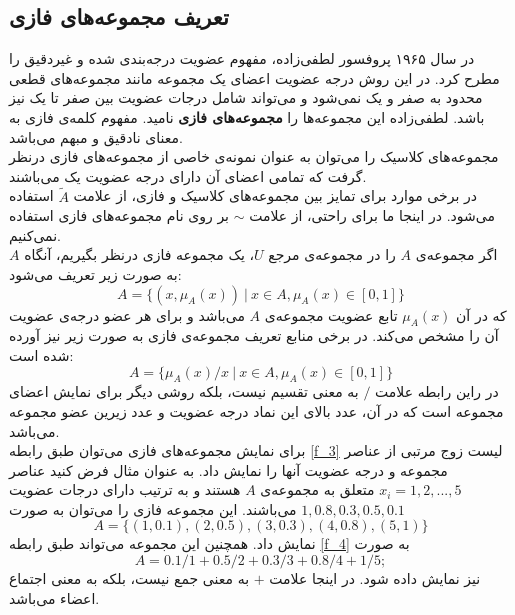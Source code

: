 \documentclass[12pt,a4paper]{article}
\begin{document}
 \subsection{تعریف مجموعه‌های فازی}
 
در سال ۱۹۶۵ پروفسور لطفی‌زاده، مفهوم عضویت درجه‌بندی شده و غیردقیق را مطرح کرد. در این روش درجه عضویت اعضای یک مجموعه مانند مجموعه‌های قطعی محدود به صفر و یک نمی‌شود و می‌تواند شامل درجات عضویت بین صفر تا یک نیز باشد. لطفی‌زاده این مجموعه‌ها را 
\textbf{مجموعه‌های فازی}
 نامید. مفهوم کلمه‌ی فازی به معنای نادقیق و مبهم می‌باشد. \\
 مجموعه‌های کلاسیک را می‌توان به عنوان نمونه‌ی خاصی از مجموعه‌های فازی درنظر گرفت که تمامی اعضای آن دارای درجه عضویت یک می‌باشند.
 \cite{Bojadziev2007}
 \\
 در برخی موارد برای تمایز بین مجموعه‌های کلاسیک و فازی، از علامت $\widetilde{A}$ استفاده می‌شود. 
 \cite{Lee2005}
 در اینجا ما برای راحتی، از علامت $ \sim $ بر روی نام مجموعه‌های فازی استفاده نمی‌کنیم.
 \\
 اگر مجموعه‌ی $A$ را در مجموعه‌ی مرجع $U$، یک مجموعه فازی درنظر بگیریم، آنگاه $A$ به صورت زیر تعریف می‌شود:
\begin{equation}\label{f_3}
A= \{  (x, \mu_{A}(x))\ |\ x \in A, \mu_{A}(x) \in [0,1]  \}
\end{equation} 
که در آن $\mu_{A}(x)$ تابع عضویت مجموعه‌ی $A$ می‌باشد و برای هر عضو درجه‌ی عضویت آن را مشخص می‌کند. 
در برخی منابع تعریف مجموعه‌ی فازی به صورت زیر نیز آورده شده است:
\begin{equation}\label{f_4}
A= \{  \mu_{A}(x)/x \ |\ x \in A, \mu_{A}(x) \in [0,1]  \}
\end{equation} 
در راین رابطه علامت $/$ به معنی تقسیم نیست، بلکه روشی دیگر برای نمایش اعضای مجموعه است که در آن، عدد بالای این نماد درجه عضویت و عدد زیرین عضو مجموعه می‌باشد.
 \cite{Bojadziev2007}
 \\
برای نمایش مجموعه‌های فازی می‌توان طبق رابطه
\ref{f_3}
لیست زوج مرتبی از عناصر مجموعه و درجه عضویت آنها را نمایش داد. به عنوان مثال فرض کنید عناصر 
$ x_{i}=1,2,...,5 $
متعلق به مجموعه‌ی $A$ هستند و به ترتیب دارای درجات عضویت 
$1, 0.8, 0.3, 0.5, 0.1$
می‌باشند. این مجموعه فازی را می‌توان به صورت
\begin{equation}
A = \{ ( 1, 0.1), (2, 0.5), (3, 0.3), (4, 0.8), (5, 1)\}
\end{equation}
 نمایش داد. همچنین این مجموعه می‌تواند طبق رابطه 
 \ref{f_4}
 به صورت
 \begin{equation}
A= 0.1/1 + 0.5/2 + 0.3/3 + 0.8/4 + 1/5;
 \end{equation}
نیز نمایش داده شود. در اینجا علامت $ + $ به معنی جمع نیست، بلکه به معنی اجتماع اعضاء می‌باشد. 
\cite{Lee2005}
\\
\end{document}
